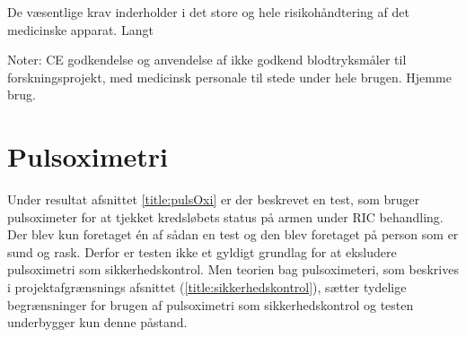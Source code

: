 De væsentlige krav inderholder i det store og hele risikohåndtering af det medicinske apparat. Langt

Noter: CE godkendelse og anvendelse af ikke godkend blodtryksmåler til forskningsprojekt, med medicinsk personale til stede under hele brugen. Hjemme brug.

\section{Pulsoximetri}
Under resultat afsnittet \ref{title:pulsOxi} er der beskrevet en test, som bruger pulsoximeter for at tjekket kredsløbets status på armen under RIC behandling. Der blev kun foretaget én af sådan en test og den blev foretaget på person som er sund og rask. Derfor er testen ikke et gyldigt grundlag for at eksludere pulsoximetri som sikkerhedskontrol. Men teorien bag pulsoximeteri, som beskrives i projektafgrænsnings afsnittet (\ref{title:sikkerhedskontrol}), sætter tydelige begrænsninger for brugen af pulsoximetri som sikkerhedskontrol og testen underbygger kun denne påstand. 



